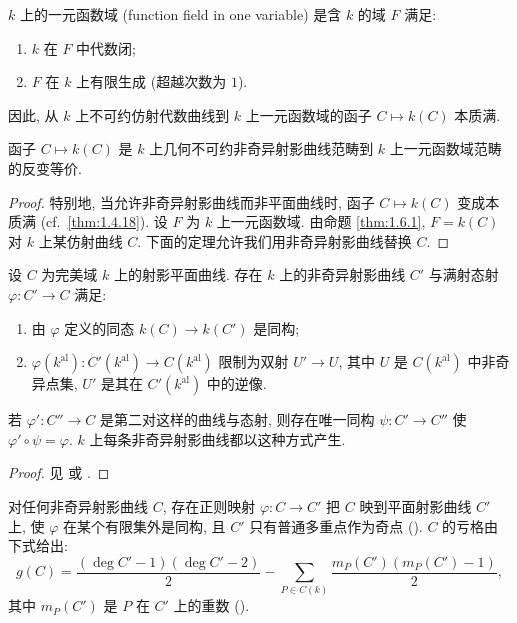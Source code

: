 \begin{definition} \label{thm:1.6.2} 
$k$ 上的一元函数域 (function field in one variable) 是含 $k$ 的域 $F$ 满足:
\begin{enumerate}[label=\textup{(\alph*)}]
\item $k$ 在 $F$ 中代数闭;
\item $F$ 在 $k$ 上有限生成 (超越次数为 $1$).
\end{enumerate}
\end{definition}

因此, 从 $k$ 上不可约仿射代数曲线到 $k$ 上一元函数域的函子 $C\mapsto k(C)$ 本质满.

\begin{theorem} \label{thm:1.6.3} 
函子 $C\mapsto k(C)$ 是 $k$ 上几何不可约非奇异射影曲线范畴到 $k$ 上一元函数域范畴的反变等价.
\end{theorem}

\begin{proof}
特别地, 当允许非奇异射影曲线而非平面曲线时, 函子 $C\mapsto k(C)$ 变成本质满 (cf.~\ref{thm:1.4.18}). 设 $F$ 为 $k$ 上一元函数域. 由命题 \ref{thm:1.6.1}, $F = k(C)$ 对 $k$ 上某仿射曲线 $C$. 下面的定理允许我们用非奇异射影曲线替换 $C$.
\end{proof}

\begin{theorem} \label{thm:1.6.4} 
设 $C$ 为完美域 $k$ 上的射影平面曲线. 存在 $k$ 上的非奇异射影曲线 $C'$ 与满射态射 $\varphi\colon C'\to C$ 满足:
\begin{enumerate}[label=\textup{(\alph*)}]
\item 由 $\varphi$ 定义的同态 $k(C)\to k(C')$ 是同构;
\item $\varphi(k^{\mathrm{al}})\colon C'(k^{\mathrm{al}})\to C(k^{\mathrm{al}})$ 限制为双射 $U'\to U$, 其中 $U$ 是 $C(k^{\mathrm{al}})$ 中非奇异点集, $U'$ 是其在 $C'(k^{\mathrm{al}})$ 中的逆像.
\end{enumerate}
若 $\varphi'\colon C''\to C$ 是第二对这样的曲线与态射, 则存在唯一同构 $\psi\colon C'\to C''$ 使 $\varphi'\circ\psi = \varphi$. $k$ 上每条非奇异射影曲线都以这种方式产生.
\end{theorem}

\begin{proof}
见 \cite{lorenzini1996} 或 \cite[Chap. 7]{fulton1969}.
\end{proof}

\begin{aside} \label{thm:1.6.5} 
对任何非奇异射影曲线 $C$, 存在正则映射 $\varphi\colon C\to C'$ 把 $C$ 映到平面射影曲线 $C'$ 上, 使 $\varphi$ 在某个有限集外是同构, 且 $C'$ 只有普通多重点作为奇点 (\cite[Chap. 7]{fulton1969}). $C$ 的亏格由下式给出:
\[
g(C) = \frac{(\deg C' - 1)(\deg C' - 2)}{2} - \sum_{P\in C(k)}\frac{m_P(C')(m_P(C')-1)}{2},
\]
其中 $m_P(C')$ 是 $P$ 在 $C'$ 上的重数 (\cite[Chap. 8, \S3]{fulton1969}).
\end{aside}

